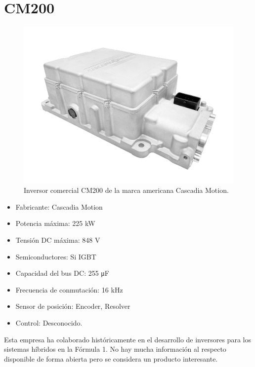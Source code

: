 \section{CM200}
\begin{figure}[H]
	\centering
	\includegraphics[width=0.7\linewidth]{fig/cascadia}
	\caption{Inversor comercial CM200 de la marca americana Cascadia Motion. \cite{cascadiamotion_cm_inverter}}
	\label{fig:cascadia}
\end{figure}

\begin{itemize}
	\item Fabricante: Cascadia Motion
	\item Potencia máxima: 225 kW
	\item Tensión DC máxima: 848 V
	\item Semiconductores: Si IGBT
	\item Capacidad del bus DC: 255 \unit{\micro\farad}
	\item Frecuencia de conmutación: 16 kHz
	\item Sensor de posición: Encoder, Resolver
	\item Control: Desconocido.
\end{itemize}

Esta empresa ha colaborado históricamente en el desarrollo de inversores para los sistemas híbridos en la Fórmula 1. No hay mucha información al respecto disponible de forma abierta pero se considera un producto interesante.
